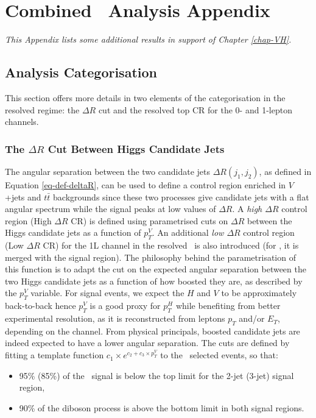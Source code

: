 \chapter{Combined \vhbc\ Analysis Appendix}
\ChapFrame

\textit{This Appendix lists some additional results in support of Chapter \ref{chap-VH}.}

%

\section{Analysis Categorisation}\label{ap-vhCat}
This section offers more details in two elements of the categorisation in the resolved regime: the $\Delta R$ cut and the resolved top CR for the 0- and 1-lepton channels.

\subsection{The $\Delta R$ Cut Between Higgs Candidate Jets}\label{ap-sec-vh-deltaR}
The angular separation between the two candidate jets $\Delta R(j_1, j_2)$, as defined in Equation \ref{eq-def-deltaR}, can be used to define a control region enriched in $V$+jets and $t\bar{t}$ backgrounds since these two processes give candidate jets with a flat angular spectrum while the signal peaks at low values of $\Delta R$. A \textit{high $\Delta R$} control region (High $\Delta R$ CR) is defined using parametrised cuts on $\Delta R$ between the Higgs candidate jets as a function of $p_T^V$. An additional \textit{low $\Delta R$} control region (Low $\Delta R$ CR) for the 1L channel in the resolved \vhb\ is also introduced (for \vhc, it is merged with the signal region). The philosophy behind the parametrisation of this function is to adapt the cut on the expected angular separation between the two Higgs candidate jets as a function of how boosted they are, as described by the $p_T^V$ variable. For signal events, we expect the $H$ and $V$ to be approximately back-to-back hence $p_T^V$ is a good proxy for $p_T^H$ while benefiting from better experimental resolution, as it is reconstructed from leptons $p_T$ and/or $E_T$, depending on the channel. From physical principals, boosted candidate jets are indeed expected to have a lower angular separation. The cuts are defined by fitting a template function $ c_1 \times e^{c_2 + c_3 \times p_T^V}$ to the \vhb\ selected events, so that:   
\begin{itemize}
\item 95\% (85\%) of the \vhb\ signal is below the top limit for the 2-jet (3-jet) signal region,
\item 90\% of the diboson process is above the bottom limit in both signal regions.
\end{itemize}

